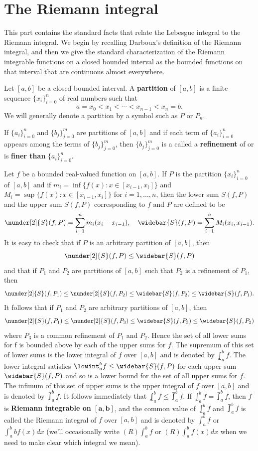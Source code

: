 \section{The Riemann integral}
This part contains the standard facts that relate the Lebesgue integral to the Riemann integral. We begin by recalling Darboux’s definition of the Riemann integral, and then we give the standard characterization of the Riemann integrable functions on a closed bounded interval as the bounded functions on that interval that are continuous almost everywhere.\par
Let $[a,b]$ be a closed bounded interval. A \textbf{partition} of $[a,b]$ is a finite sequence $\{x_i\}_{i=0}^{n}$ of real numbers such that
\[a=x_0<x_1<\cdots<x_{n-1}<x_n=b.\]
We will generally denote a partition by a symbol such as $P$ or $P_n$.\par
If $\{a_i\}_{i=0}^{n}$ and $\{b_j\}_{j=0}^{m}$ are partitions of $[a,b]$ and if each term of $\{a_i\}_{i=0}^{n}$ appears among the terms of $\{b_j\}_{j=0}^{m}$, then $\{b_j\}_{j=0}^{m}$ is a called a \textbf{refinement} of or is \textbf{finer than} $\{a_i\}_{i=0}^{n}$.\par
Let $f$ be a bounded real-valued function on $[a,b]$. If $P$ is the partition $\{x_i\}_{i=0}^{n}$ of $[a,b]$ and if $m_i=\inf\{f(x):x\in[x_{i-1},x_i]\}$ and $M_i=\sup\{f(x):x\in[x_{i-1},x_i]\}$ for $i=1,\dots,n$, then the lower sum $S(f,P)$ and the upper sum $S(f,P)$ corresponding to $f$ and $P$ are defined to be 
\[\nunder[2]{S}(f,P)=\sum_{i=1}^{n}m_i(x_i-x_{i-1}),\quad\widebar{S}(f,P)=\sum_{i=1}^{n}M_i(x_i,x_{i-1}).\]
It is easy to check that if $P$ is an arbitrary partition of $[a,b]$, then
\[\nunder[2]{S}(f,P)\leq\widebar{S}(f,P)\]
and that if $P_1$ and $P_2$ are partitions of $[a,b]$ such that $P_2$ is a refinement of $P_1$, then
\[\nunder[2]{S}(f,P_1)\leq\nunder[2]{S}(f,P_2)\leq\widebar{S}(f,P_2)\leq\widebar{S}(f,P_1).\]
It follows that if $P_1$ and $P_2$ are arbitrary partitions of $[a,b]$, then
\[\nunder[2]{S}(f,P_1)\leq\nunder[2]{S}(f,P_3)\leq\widebar{S}(f,P_3)\leq\widebar{S}(f,P_2)\]
where $P_3$ is a common refinement of $P_1$ and $P_2$. Hence the set of all lower sums for f is bounded above by each of the upper sums for $f$. The supremum of this set of lower sums is the lower integral of $f$ over $[a,b]$ and is denoted by $\lowint_{a}^{b}f$. The lower integral satisfies $\lowint_{a}^{b}f\leq\widebar{S}(f,P)$ for each upper sum $\widebar{S}(f,P)$ and so is a lower bound for the set of all upper sums for $f$. The infimum of this set of upper sums is the upper integral of $f$ over $[a,b]$ and is denoted by $\upint_{a}^{b}f$. It follows immediately that $\lowint_{a}^{b}f\leq\upint_{a}^{b}f$. If $\lowint_{a}^{b}f=\upint_{a}^{b}f$, then $f$ is \textbf{Riemann integrable on $\bm{[a,b]}$}, and the common value of $\lowint_{a}^{b}f$ and $\upint_{a}^{b}f$ is called the Riemann integral of $f$ over $[a,b]$ and is denoted by $\int_a^bf$ or $\int_a^bbf(x)dx$ (we'll occasionally write $(R)\int_a^bf$ or $(R)\int_a^bf(x)dx$ when we need to make clear which integral we mean).\par

